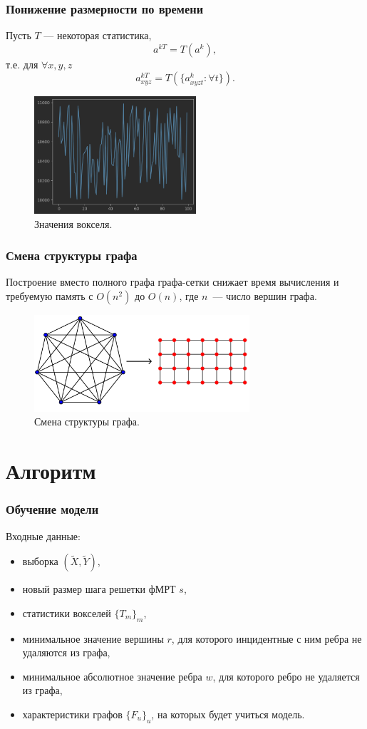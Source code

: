 \documentclass{beamer}
\begin{document}
	\begin{frame} 
		\frametitle{Понижение размерности по времени}
		Пусть $T$ --- некоторая статистика,
		\[
		a^{kT} = T(a^k),
		\]
		т.е. для $\forall x, y, z$
		\[
		a^{kT}_{xyz} = T(\{a_{xyzt}^k : \forall t\}).
		\]
		
		\begin{figure}
			\includegraphics[width=6cm]{../images/time_series.png}
			\caption{Значения вокселя.} 
			\label{fg:11}
		\end{figure}	
	\end{frame}	

	\begin{frame} 
		\frametitle{Смена структуры графа}
		
		Построение вместо полного графа графа-сетки снижает время вычисления и требуемую память с $O(n^2)$ до $O(n)$, где $n$~--- число вершин графа.
		
		\vspace{0.5cm}
						
		\begin{figure}
			\includegraphics[width=8cm]{../images/full_grid_graphs_1.pdf}
			\caption{Смена структуры графа.} 
			\label{fg:9}
		\end{figure}			
	\end{frame}	

	\section{Алгоритм}
	\begin{frame} 
		\frametitle{Обучение модели}
		Входные данные:
		\begin{itemize}
			\item выборка $(\widetilde{X}, \widetilde{Y})$,
			\item новый размер шага решетки фМРТ $s$,
			\item статистики вокселей $\{T_m\}_m$,
			\item минимальное значение вершины $r$, для которого инцидентные с ним ребра не удаляются из графа,
			\item минимальное абсолютное значение ребра $w$, для которого ребро не удаляется из графа,
			\item характеристики графов $\{F_u\}_u$, на которых будет учиться модель.
		\end{itemize}
	\end{frame}
\end{document}
